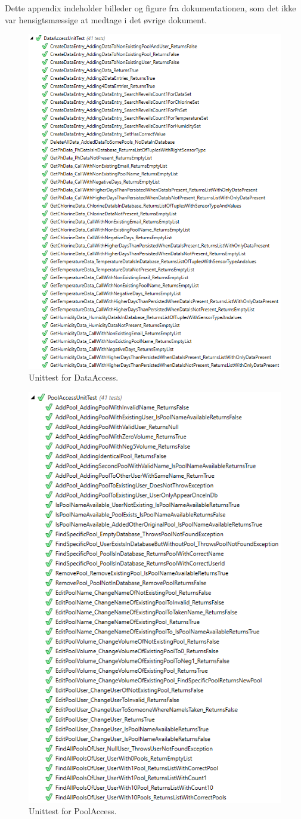 Dette appendix indeholder billeder og figure fra dokumentationen, som det ikke var hensigtsmæssige at medtage i det øvrige dokument.

\begin{figure}[h]
\centering
\includegraphics[width=0.7\linewidth]{figs/test/dataaccessunittest_appendix.png}
\caption{Unittest for DataAccess.}
\label{fig:dataaccessunittest_appendix}
\end{figure}

\begin{figure}[h]
\centering
\includegraphics[width=0.7\linewidth]{figs/test/poolaccessunittest_appendix.png}
\caption{Unittest for PoolAccess.}
\label{fig:poolaccessunittest_appendix}
\end{figure}

